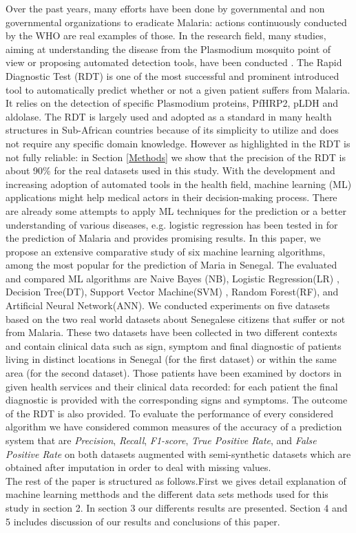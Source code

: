 Over the past years, many efforts have been done by governmental and non governmental organizations  to eradicate Malaria:  actions continuously conducted by the WHO are real examples of those.  In the research field, many studies, aiming at understanding the disease from the Plasmodium mosquito point of view or proposing automated detection tools, have been conducted \cite{Ga19,Le74,ermert2011development,Hu17}. The Rapid Diagnostic Test (RDT) \cite{Hu17} is one of the most successful and prominent introduced tool to automatically predict whether or not a given patient suffers from Malaria. It relies on the
detection of specific Plasmodium proteins, PfHRP2, pLDH
and aldolase. The RDT is largely used and adopted as a standard in many health structures in Sub-African countries because of its simplicity to utilize and does not require any specific domain knowledge. However as highlighted in \cite{Hu17} the RDT is not fully reliable:  in Section \ref{Methods} we show that the precision of the RDT is about 90\% for the real datasets used in this study.
With the development and increasing adoption of automated tools in the health field, machine learning  (ML) \cite{mitchell1997machine, Ug1} applications might help medical actors in their decision-making process. There are already some attempts to apply ML techniques for the prediction or a better understanding of various diseases, e.g. logistic regression has been tested in \cite{mbaye2019towards} for the prediction of Malaria and provides promising results.
 In this paper, we propose an  extensive comparative study of six machine learning algorithms, among the most popular for the prediction of Maria in Senegal. The evaluated and compared ML algorithms are Naive Bayes (NB), Logistic Regression(LR) ,  Decision Tree(DT), Support Vector Machine(SVM) ,
 Random Forest(RF),
 and Artificial Neural Network(ANN). We conducted experiments on five datasets based on the two real world datasets about Senegalese citizens that suffer or not from Malaria. These two datasets have been collected in two different contexts and contain clinical data such as sign, symptom and final diagnostic of patients living in distinct locations in Senegal (for the first dataset) or within the same area (for the second dataset). Those patients have been examined by doctors in given health services and their clinical data recorded: for each patient the final diagnostic is provided with the corresponding signs and symptoms. The outcome of the RDT is also provided. To evaluate the performance of every considered algorithm we have considered common measures of the accuracy of a prediction system that are \emph{Precision}, \emph{Recall}, \emph{F1-score}, \emph{True Positive Rate}, and
 \emph{False Positive Rate} on both datasets augmented with semi-synthetic datasets which are obtained after imputation in order to deal with missing values.\\
 
The rest of the paper is structured as follows.First we gives detail explanation of machine learning metthods and the different data sets methods used for this study in section 2. In section 3 our  differents results are presented. Section 4 and 5 includes discussion of our results and conclusions of this paper.
 
 